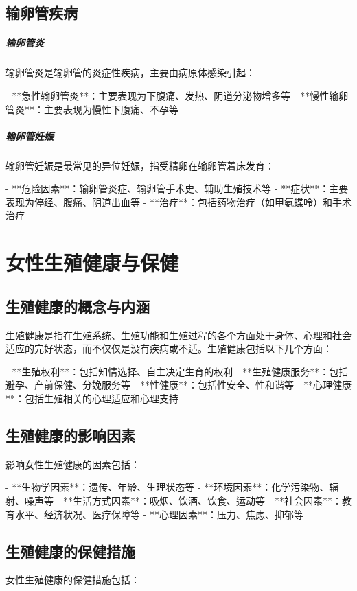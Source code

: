 \begin{enumerate}
\subsection{输卵管疾病}

\subparagraph{输卵管炎}

输卵管炎是输卵管的炎症性疾病，主要由病原体感染引起：

- **急性输卵管炎**：主要表现为下腹痛、发热、阴道分泌物增多等
- **慢性输卵管炎**：主要表现为慢性下腹痛、不孕等

\subparagraph{输卵管妊娠}

输卵管妊娠是最常见的异位妊娠，指受精卵在输卵管着床发育：

- **危险因素**：输卵管炎症、输卵管手术史、辅助生殖技术等
- **症状**：主要表现为停经、腹痛、阴道出血等
- **治疗**：包括药物治疗（如甲氨蝶呤）和手术治疗

\section{女性生殖健康与保健}

\subsection{生殖健康的概念与内涵}

生殖健康是指在生殖系统、生殖功能和生殖过程的各个方面处于身体、心理和社会适应的完好状态，而不仅仅是没有疾病或不适。生殖健康包括以下几个方面：

- **生殖权利**：包括知情选择、自主决定生育的权利
- **生殖健康服务**：包括避孕、产前保健、分娩服务等
- **性健康**：包括性安全、性和谐等
- **心理健康**：包括生殖相关的心理适应和心理支持

\subsection{生殖健康的影响因素}

影响女性生殖健康的因素包括：

- **生物学因素**：遗传、年龄、生理状态等
- **环境因素**：化学污染物、辐射、噪声等
- **生活方式因素**：吸烟、饮酒、饮食、运动等
- **社会因素**：教育水平、经济状况、医疗保障等
- **心理因素**：压力、焦虑、抑郁等

\subsection{生殖健康的保健措施}

女性生殖健康的保健措施包括：


\end{enumerate}
